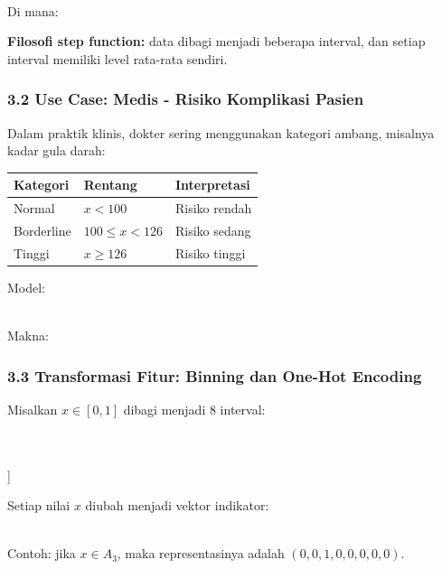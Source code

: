 \documentclass[12pt,a4paper]{article}
\begin{document}
\\[
\hat{y}(x) = \beta_0 + \sum_{m=1}^{M} \beta_m \mathbb{I}(c_{m-1} \leq x < c_m)
\\]


Di mana:


\textbf{Filosofi step function:} data dibagi menjadi beberapa interval, dan setiap interval memiliki level rata-rata sendiri.


\subsubsection{3.2 Use Case: Medis - Risiko Komplikasi Pasien}

Dalam praktik klinis, dokter sering menggunakan kategori ambang, misalnya kadar gula darah:


\begin{tabular}{|l|l|l|}
\hline
Kategori & Rentang & Interpretasi \\
\hline
Normal & $x < 100$ & Risiko rendah \\
\hline
Borderline & $100 \leq x < 126$ & Risiko sedang \\
\hline
Tinggi & $x \geq 126$ & Risiko tinggi \\
\hline
\end{tabular}


Model:


\\[
\hat{y} = \beta_0 + \beta_1 \mathbb{I}(x \in A_1) + \beta_2 \mathbb{I}(x \in A_2) + \beta_3 \mathbb{I}(x \in A_3)
\\]


Makna:


\subsubsection{3.3 Transformasi Fitur: Binning dan One-Hot Encoding}

Misalkan $x \in [0, 1]$ dibagi menjadi 8 interval:


\\[
A_1 = [0, 0.125), \quad A_2 = [0.125, 0.25), \quad \dots, \quad A_8 = [0.875, 1]
\\]


Setiap nilai $x$ diubah menjadi vektor indikator:


\\[
x \rightarrow (\mathbb{I}(x \in A_1), \mathbb{I}(x \in A_2), \dots, \mathbb{I}(x \in A_8))
\\]


Contoh: jika $x \in A_3$, maka representasinya adalah $(0, 0, 1, 0, 0, 0, 0, 0)$.
\end{document}
